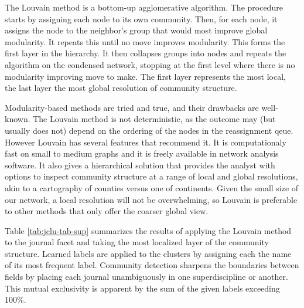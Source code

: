\documentclass[]{book}
\theoremstyle{definition}
\theoremstyle{definition}
\theoremstyle{definition}
\theoremstyle{remark}
\begin{document}
The Louvain method is a bottom-up agglomerative algorithm. The procedure
starts by assigning each node to its own community. Then, for each node,
it assigns the node to the neighbor's group that would most improve
global modularity. It repeats this until no move improves modularity.
This forms the first layer in the hierarchy. It then collapses groups
into nodes and repeats the algorithm on the condensed network, stopping
at the first level where there is no modularity improving move to make.
The first layer represents the most local, the last layer the most
global resolution of community structure.

Modularity-based methods are tried and true, and their drawbacks are
well-known. The Louvain method is not deterministic, as the outcome may
(but usually does not) depend on the ordering of the nodes in the
reassignment qeue. However Louvain has several features that recommend
it. It is computationaly fast on small to medium graphs and it is freely
available in network analysis software. It also gives a hierarchical
solution that provides the analyst with options to inspect community
structure at a range of local and global resolutions, akin to a
cartography of counties versus one of continents. Given the small size
of our network, a local resolution will not be overwhelming, so Louvain
is preferable to other methods that only offer the coarser global view.

Table \ref{tab:jclu-tab-sup} summarizes the results of applying the
Louvain method to the journal facet and taking the most localized layer
of the community structure. Learned labels are applied to the clusters
by assigning each the name of its most frequent label. Community
detection sharpens the boundaries between fields by placing each journal
unambiguously in one superdiscipline or another. This mutual exclusivity
is apparent by the sum of the given labels exceeding 100\%.
\end{document}
